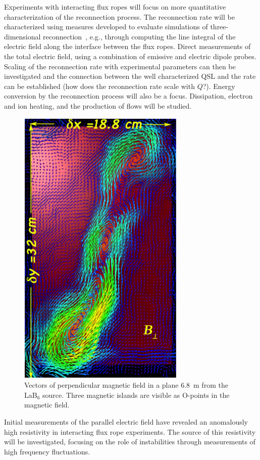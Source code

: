 \documentclass[11pt]{article}
\renewcommand{\cite}{\citep}
\begin{document}
Experiments with interacting flux ropes will focus on more
quantitative characterization of the reconnection process.  The
reconnection rate will be characterized using measures developed to
evaluate simulations of three-dimensional
reconnection~\cite{finn:2014,daughton:2014}, e.g., through computing
the line integral of the electric field along the interface between the
flux ropes. Direct measurements of the total electric field, using a
combination of emissive and electric dipole probes.  Scaling of the
reconnection rate with experimental parameters can then be investigated
and the connection between the well characterized QSL and the rate can
be established (how does the reconnection rate scale with $Q$?).
Energy conversion by the reconnection process will also be a focus.
Dissipation, electron and ion heating, and the production of flows
will be studied.  
\begin{figure}
\begin{center}
\includegraphics[width=2.5truein]{tearing}
\caption{\small Vectors of perpendicular magnetic field in a plane 6.8~m from
  the LaB$_6$ source.  Three magnetic islands are visible as O-points
  in the magnetic field.}\label{tearing}
\end{center}
\end{figure}
Initial measurements of the parallel electric field
have revealed an anomalously high resistivity in interacting flux rope
experiments.  The source of this resistivity will be investigated,
focusing on the role of instabilities through measurements of high
frequency fluctuations.
\end{document}
